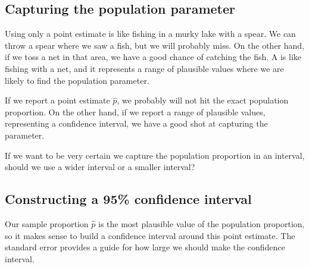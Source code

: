 \subsection{Capturing the population parameter}

Using only a point estimate is like fishing in a murky
lake with a spear. We can throw a spear where we
saw a fish, but we will probably miss. On the other hand,
if we toss a net in that area, we have a good chance of
catching the fish.
A  is like fishing with a net,
and it represents a range of plausible values where we
are likely to find the population parameter.

If we report a point estimate $\hat{p}$, we probably
will not hit the exact population proportion. On the
other hand, if we report a range of plausible values,
representing a confidence interval,
we have a good shot at capturing the parameter.

\begin{exercisewrap}
\begin{nexercise}
If we want to be very certain we capture the population
proportion in an interval, should we use a wider interval
or a smaller interval?\footnotemark
\end{nexercise}
\end{exercisewrap}

\subsection{Constructing a 95\% confidence interval}

Our sample proportion $\hat{p}$ is the most plausible
value of the population proportion, so it makes sense
to build a confidence interval around this point estimate.
The standard error
provides a guide for how
large we should make the confidence interval.

